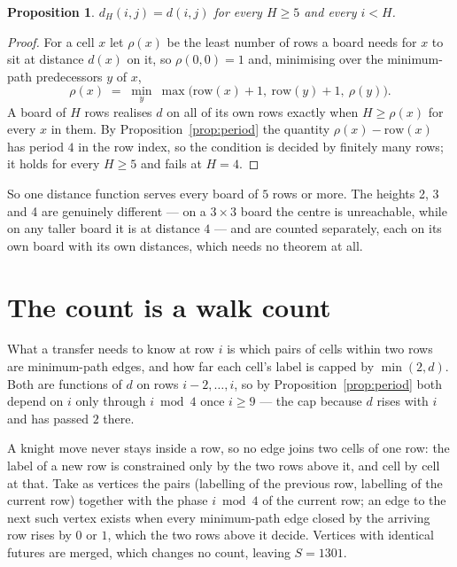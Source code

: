 \documentclass[11pt,a4paper]{article}
\theoremstyle{plain}
\newtheorem{proposition}[theorem]{Proposition}
\theoremstyle{definition}
\begin{document}
\begin{proposition}\label{prop:height}
$d_H(i,j)=d(i,j)$ for every $H\ge5$ and every $i<H$.
\end{proposition}

\begin{proof}
For a cell $x$ let $\rho(x)$ be the least number of rows a board needs for $x$ to sit at distance $d(x)$ on it, so $\rho(0,0)=1$ and, minimising over the minimum-path predecessors $y$ of $x$,
\[ \rho(x)\;=\;\min_y\ \max\bigl(\mathrm{row}(x)+1,\ \mathrm{row}(y)+1,\ \rho(y)\bigr). \]
A board of $H$ rows realises $d$ on all of its own rows exactly when $H\ge\rho(x)$ for every $x$ in them. By Proposition~\ref{prop:period} the quantity $\rho(x)-\mathrm{row}(x)$ has period $4$ in the row index, so the condition is decided by finitely many rows; it holds for every $H\ge5$ and fails at $H=4$.
\end{proof}

So one distance function serves every board of $5$ rows or more. The heights 2, 3 and 4 are genuinely different --- on a $3\times3$ board the centre is unreachable, while on any taller board it is at distance $4$ --- and are counted separately, each on its own board with its own distances, which needs no theorem at all.

\section{The count is a walk count}

What a transfer needs to know at row $i$ is which pairs of cells within two rows are minimum-path edges, and how far each cell's label is capped by $\min(2,d)$. Both are functions of $d$ on rows $i-2,\dots,i$, so by Proposition~\ref{prop:period} both depend on $i$ only through $i\bmod 4$ once $i\ge9$ --- the cap because $d$ rises with $i$ and has passed $2$ there.

A knight move never stays inside a row, so no edge joins two cells of one row: the label of a new row is constrained only by the two rows above it, and cell by cell at that. Take as vertices the pairs (labelling of the previous row, labelling of the current row) together with the phase $i\bmod 4$ of the current row; an edge to the next such vertex exists when every minimum-path edge closed by the arriving row rises by $0$ or $1$, which the two rows above it decide. Vertices with identical futures are merged, which changes no count, leaving $S=1301$.
\end{document}
